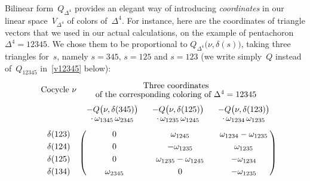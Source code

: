 \documentclass[12pt]{article}
\theoremstyle{definition}
\theoremstyle{remark}
\begin{document}
Bilinear form~$Q_{\Delta^4}$ provides an elegant way of introducing \emph{coordinates} in our linear space~$V_{\Delta^4}$ of colors of~$\Delta^4$. For instance, here are the coordinates of triangle vectors that we used in our actual calculations, on the example of pentachoron $\Delta^4 = 12345$. We chose them to be proportional to $Q_{\Delta^4}\bigl(\nu,\delta(s)\bigr)$, taking three triangles for~$s$, namely $s=345$, $s=125$ and $s=123$ (we write simply~$Q$ instead of~$Q_{12345}$ in~\eqref{v12345} below):
\begin{equation}\label{v12345}
   \renewcommand{\arraystretch}{1.25}
  \begin{blockarray}{cccc}  
    \text{Cocycle }\nu \qquad & \BAmulticolumn{3}{c}{ \begin{matrix}{\text{Three coordinates}} \\[-1ex]
                      \text{of the corresponding coloring of } \Delta^4 = 12345 \end{matrix} }  \\
    \noalign{\smallskip}
    \begin{block}{cccc}
           & \begin{matrix} -Q\bigl(\nu,\delta(345)\bigr)\\[-1ex] \cdot\, \omega _{1345}\, \omega _{2345} \end{matrix} 
           & \begin{matrix} -Q\bigl(\nu,\delta(125)\bigr)\\[-1ex] \cdot\, \omega _{1235}\, \omega _{1245} \end{matrix} 
           & \begin{matrix} -Q\bigl(\nu,\delta(123)\bigr)\\[-1ex] \cdot\, \omega _{1234}\, \omega _{1235} \end{matrix}    \\
    \end{block}
    \noalign{\smallskip}
    \begin{block}{c(ccc)}
\delta(123) &       0                        & \omega _{1245}                & \omega _{1234}-\omega _{1235} \\
\delta(124) &       0                        & -\omega _{1235}               & \omega _{1235}                \\
\delta(125) &       0                        & \omega _{1235}-\omega _{1245} & -\omega _{1234}               \\
\delta(134) & \omega _{2345}                 &          0                    & -\omega _{1235}               \\

\end{block}
\end{blockarray}
\end{equation}
\end{document}
